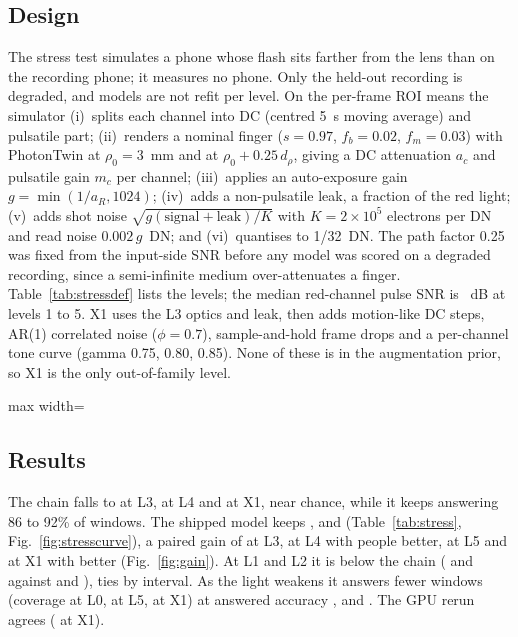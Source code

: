 \documentclass[11pt,letterpaper]{article}
\newcommand{\code}[1]{\texttt{\detokenize{#1}}}
\begin{document}
\subsection{Design}
The stress test simulates a phone whose flash sits farther from the lens than on the recording phone; it measures no phone. Only the held-out recording is degraded, and models are not refit per level. On the per-frame ROI means the simulator (i)~splits each channel into DC (centred 5~s moving average) and pulsatile part; (ii)~renders a nominal finger ($s=0.97$, $f_b=0.02$, $f_m=0.03$) with PhotonTwin at $\rho_0=3$~mm and at $\rho_0+0.25\,d_\rho$, giving a DC attenuation $a_c$ and pulsatile gain $m_c$ per channel; (iii)~applies an auto-exposure gain $g=\min(1/a_R,1024)$; (iv)~adds a non-pulsatile leak, a fraction of the red light; (v)~adds shot noise $\sqrt{g(\text{signal}+\text{leak})/K}$ with $K=2\times10^5$ electrons per DN and read noise $0.002\,g$~DN; and (vi)~quantises to 1/32~DN. The path factor 0.25 was fixed from the input-side SNR before any model was scored on a degraded recording, since a semi-infinite medium over-attenuates a finger. Table~\ref{tab:stressdef} lists the levels; the median red-channel pulse SNR is \StressSNR{}~dB at levels 1 to 5. X1 uses the L3 optics and leak, then adds motion-like DC steps, AR(1) correlated noise ($\phi=0.7$), sample-and-hold frame drops and a per-channel tone curve (gamma 0.75, 0.80, 0.85). None of these is in the augmentation prior, so X1 is the only out-of-family level.

\begin{table}[tbp]
\centering
\caption{Simulated distant-flash levels (\code{results/photon/HARNESS.md}): added offset $d_\rho$, share of DC light kept per channel, pulsatile gain $m_c$, auto-exposure gain, leak fraction and read noise after gain. Blue dies first, red last.}\label{tab:stressdef}
\begin{adjustbox}{max width=\linewidth}\end{adjustbox}
\end{table}

\subsection{Results}
The chain falls to \ChainLthree{} at L3, \ChainLfour{} at L4 and \ChainXone{} at X1, near chance, while it keeps answering 86 to 92\% of windows. The shipped model keeps \WinLthree{}, \WinLfour{} and \WinXone{} (Table~\ref{tab:stress}, Fig.~\ref{fig:stresscurve}), a paired gain of \WinLthreeDiff{} \WinLthreeDiffCI{} at L3, \WinLfourDiff{} \WinLfourDiffCI{} at L4 with \WinLfourBetter{} people better, \WinLfiveDiff{} \WinLfiveDiffCI{} at L5 and \WinXoneDiff{} \WinXoneDiffCI{} at X1 with \WinXoneBetter{} better (Fig.~\ref{fig:gain}). At L1 and L2 it is below the chain (\WinLone{} and \WinLtwo{} against \ChainLone{} and \ChainLtwo{}), ties by interval. As the light weakens it answers fewer windows (coverage \WinLzeroCov{} at L0, \WinLfiveCov{} at L5, \WinXoneCov{} at X1) at answered accuracy \WinLzeroAnsAcc{}, \WinLfiveAnsAcc{} and \WinXoneAnsAcc{}. The GPU rerun agrees (\DistillTwoGpuXone{} at X1).
\end{document}

